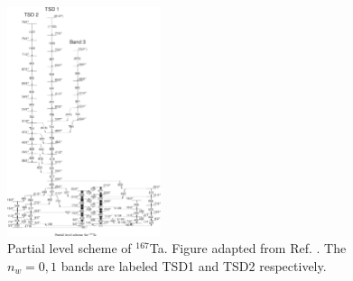 \begin{figure}[ht!]
\centerline{\includegraphics[width=0.4\textwidth]{./img/c4/167Ta_scheme.png}}
	\caption{Partial level scheme of $^{167}$Ta. Figure adapted from Ref. \cite{wobblingIn167Ta}. The $n_w=0,1$ bands are labeled TSD1 and TSD2 respectively.\label{fig:chp4-last-wobb}}
\end{figure}

